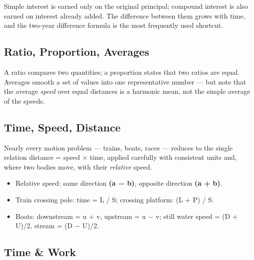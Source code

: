 Simple interest is earned only on the original principal; compound interest is also earned on interest
already added. The difference between them grows with time, and the two-year difference formula is the most
frequently used shortcut.



\needspace{125pt}

\hypertarget{p1-05--ratio-proportion-averages}{%
\subsection{Ratio, Proportion, Averages}\label{p1-05--ratio-proportion-averages}}

A ratio compares two quantities; a proportion states that two ratios are equal. Averages smooth a set of
values into one representative number --- but note that the average \emph{speed} over equal distances is a
harmonic mean, not the simple average of the speeds.



\needspace{125pt}

\hypertarget{p1-05--time-speed-distance}{%
\subsection{Time, Speed, Distance}\label{p1-05--time-speed-distance}}

Nearly every motion problem --- trains, boats, races --- reduces to the single relation distance = speed ×
time, applied carefully with consistent units and, where two bodies move, with their \emph{relative} speed.



\begin{itemize}
\tightlist
\item
  Relative speed: same direction \textbf{(a − b)}, opposite direction \textbf{(a + b)}.
\item
  Train crossing pole: time = L / S; crossing platform: (L + P) / S.
\item
  Boats: downstream = u + v, upstream = u − v; still water speed = (D + U)/2, stream = (D − U)/2.
\end{itemize}

\needspace{125pt}

\hypertarget{p1-05--time--work}{%
\subsection{Time \& Work}\label{p1-05--time--work}}


